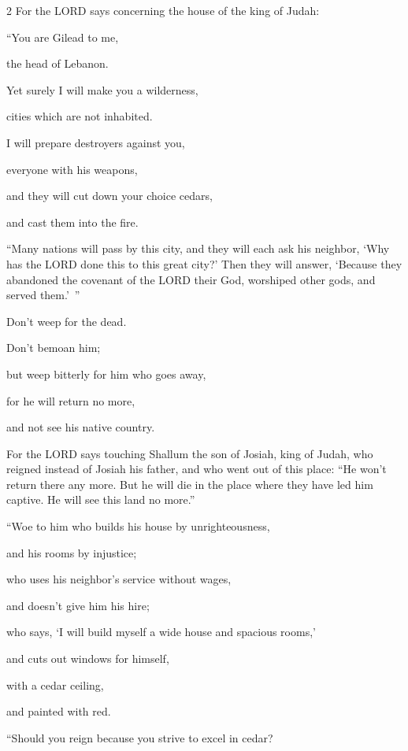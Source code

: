 \begin{multicols}{2}
\myverse{}For the LORD says concerning the house of the king of Judah:

“You are Gilead to me,

the head of Lebanon.

Yet surely I will make you a wilderness,

cities which are not inhabited.


\myverse{}I will prepare destroyers against you,

everyone with his weapons,

and they will cut down your choice cedars,

and cast them into the fire.


\myverse{}“Many nations will pass by this city, and they will each ask his neighbor, ‘Why has the LORD done this to this great city?’ \myverse{}Then they will answer, ‘Because they abandoned the covenant of the LORD their God, worshiped other gods, and served them.’ ”


\myverse{}Don’t weep for the dead.

Don’t bemoan him;

but weep bitterly for him who goes away,

for he will return no more,

and not see his native country.


\myverse{}For the LORD says touching Shallum the son of Josiah, king of Judah, who reigned instead of Josiah his father, and who went out of this place: “He won’t return there any more. \myverse{}But he will die in the place where they have led him captive. He will see
this land no more.”

 \myverse{}“Woe to him who builds his house by unrighteousness,

and his rooms by injustice;

who uses his neighbor’s service without wages,

and doesn’t give him his hire;


\myverse{}who says, ‘I will build myself a wide house and spacious rooms,’

and cuts out windows for himself,

with a cedar ceiling,

and painted with red.

\vspace{\baselineskip}

\myverse{}“Should you reign because you strive to excel in cedar?


\end{multicols}

